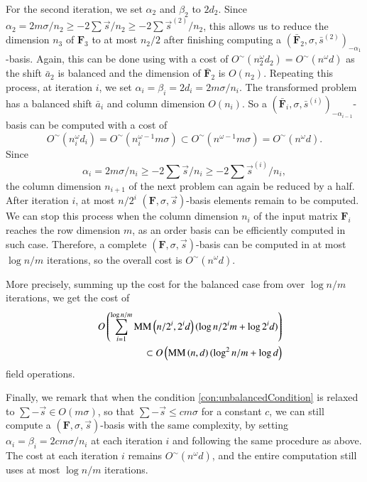 \begin{pf}
For the second iteration, we set $\alpha_{2}$ and $\beta_{2}$ to
$2d_{2}$. Since $\alpha_{2}=2m\sigma/n_{2}\ge-2\sum\vec{s}/n_{2}\ge-2\sum\vec{s}^{\left(2\right)}/n_{2}$,
this allows us to reduce the dimension $n_{3}$ of $\mathbf{F}_{3}$
to at most $n_{2}/2$ after finishing computing a $\left(\bar{\mathbf{F}}_{2},\sigma,\bar{s}^{\left(2\right)}\right)_{-\alpha_{1}}$-basis.
Again, this can be done using  with a cost of
$O^{\sim}\left(n_{2}^{\omega}d_{2}\right)=O^{\sim}\left(n^{\omega}d\right)$
as the shift $\bar{a}_{2}$ is balanced and the dimension of $\bar{\mathbf{F}}_{2}$
is $O\left(n_{2}\right)$. Repeating this process, at iteration $i$,
we set $\alpha_{i}=\beta_{i}=2d_{i}=2m\sigma/n_{i}$. The transformed
problem has a balanced shift $\bar{a}_{i}$ and column dimension $O\left(n_{i}\right)$.
So a $\left(\bar{\mathbf{F}}_{i},\sigma,\bar{s}^{\left(i\right)}\right)_{-\alpha_{i-1}}$-basis
can be computed with a cost of \[
O^{\sim}\left(n_{i}^{\omega}d_{i}\right)=O^{\sim}\left(n_{i}^{\omega-1}m\sigma\right)\subset O^{\sim}\left(n^{\omega-1}m\sigma\right)=O^{\sim}\left(n^{\omega}d\right).\]
 Since \[
\alpha_{i}=2m\sigma/n_{i}\ge-2\sum\vec{s}/n_{i}\ge-2\sum\vec{s}^{\left(i\right)}/n_{i},\]
 the column dimension $n_{i+1}$ of the next problem can again be
reduced by a half. After iteration $i$, at most $n/2^{i}$ $\left(\mathbf{F},\sigma,\vec{s}\right)$-basis
elements remain to be computed. We can stop this process when the
column dimension $n_{i}$ of the input matrix $\mathbf{F}_{i}$ reaches
the row dimension $m$, as an order basis can be efficiently computed
in such case. Therefore, a complete $\left(\mathbf{F},\sigma,\vec{s}\right)$-basis
can be computed in at most $\log n/m$ iterations, so the overall
cost is $O^{\sim}\left(n^{\omega}d\right)$.

More precisely, summing up the cost for the balanced case from 
over $\log n/m$ iterations, we get the cost of \begin{eqnarray*}
 &  & O\left(\sum_{i=1}^{\log n/m}\MM\left(n/2^{i},2^{i}d\right)(\log n/2^{i}m+\log2^{i}d)\right)\\
 &  & \subset O\left(\MM\left(n,d\right)(\log^{2}n/m+\log d\right)\end{eqnarray*}
 field operations. 
\end{pf}
 Finally, we remark that when the condition
\eqref{con:unbalancedCondition} is relaxed to $\sum-\vec{s}\in O\left(m\sigma\right)$,
so that $\sum-\vec{s}\le cm\sigma$ for a constant $c$, we can still
compute a $\left(\mathbf{F},\sigma,\vec{s}\right)$-basis with the
same complexity, by setting $\alpha_{i}=\beta_{i}=2cm\sigma/n_{i}$
at each iteration $i$ and following the same procedure as above.
The cost at each iteration $i$ remains $O^{\sim}\left(n^{\omega}d\right)$,
and the entire computation still uses at most $\log n/m$ iterations. 
